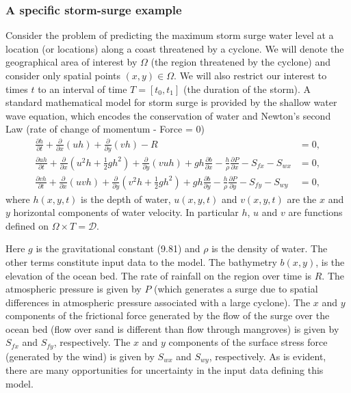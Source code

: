 

\subsubsection*{A specific storm-surge example}
Consider the problem of predicting the maximum 
storm surge water level at a location (or locations) along a coast threatened by a cyclone. We will denote the geographical area of interest by $\Omega$ 
(the region threatened by the cyclone) and consider only 
spatial points $(x,y) \in \Omega$. We will also restrict our interest to times $t$ to an interval of time $T = [t_0, t_1]$ (the duration of the storm). 
A standard mathematical model for storm surge is provided 
by the shallow water wave equation,  which encodes the conservation of water and Newton's second Law (rate of change of momentum - Force = 0) 
\begin{subequations}
 \label{eqn:storm} 
\begin{align}
\frac{\partial h}{\partial t} +
\frac{\partial }{\partial x} \left(uh\right) + \frac{\partial }{\partial y} \left(vh\right) -R & =  0 ,\\
\frac{\partial uh}{\partial t} +
\frac{\partial }{\partial x} \left(u^2h +  \frac12 gh^2 \right) 
+ \frac{\partial }{\partial y} \left(vuh\right) + gh \frac{\partial b}{\partial x} 
- \frac{h}{\rho} \frac{\partial P}{\partial  x} - S_{fx} - S_{wx}  &= 0 ,   \\
\frac{\partial vh}{\partial t} +
\frac{\partial }{\partial x} \left(uvh  \right) 
+ \frac{\partial }{\partial y} \left(v^2h + \frac12 g h^2 \right) + gh \frac{\partial b}{\partial y} 
- \frac{h}{\rho} \frac{\partial P}{\partial  y} - S_{fy} -  S_{wy}& = 0,  
\end{align}
\end{subequations}
where $h(x,y,t)$ is the depth of water, $u(x,y,t)$ and $v(x,y,t)$ are the $x$ and $y$ horizontal components of water velocity. In particular $h$, $u$ and $v$ are functions defined on $\Omega \times T = \mathcal{D}$. 

Here $g$ is the gravitational constant (9.81) and $\rho$ is the density of water. 
The other terms constitute input data to the model. 
The bathymetry $b(x,y)$, is the  elevation of the ocean bed.
The rate of rainfall on the region over time is $R$.
The atmospheric pressure is given by $P$ (which generates a surge due to spatial differences in atmospheric pressure associated with a large cyclone).
The $x$ and $y$ components of the frictional force generated by the flow of the surge over the ocean bed (flow over sand is different than flow through mangroves) is given by $S_{fx}$ and $S_{fy}$, respectively. 
The $x$ and $y$ components of the surface stress force (generated by the wind) is given by $S_{wx}$ and $S_{wy}$, respectively.
As is evident, there are many opportunities for uncertainty in the input  data defining this model. 

